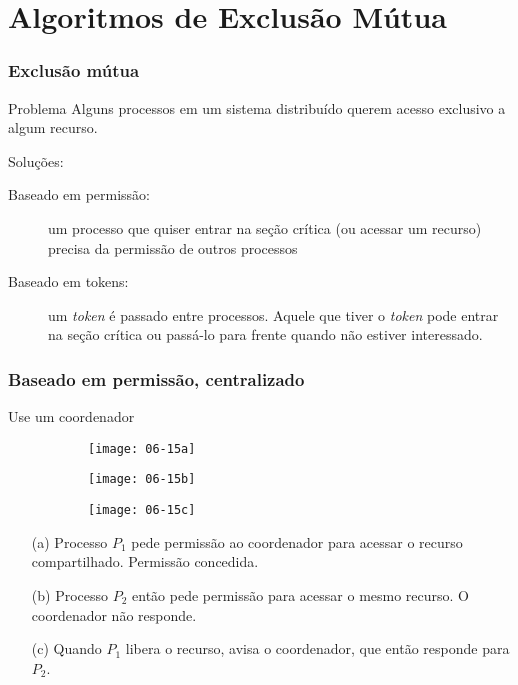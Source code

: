 \documentclass[Ligatures=TeX,table,brazil,svgnames,usetotalslideindicator,compress,10pt]{beamer}
\begin{document}
\section{Algoritmos de Exclusão Mútua}

\begin{frame}
  \frametitle{Exclusão mútua}
  \begin{alertblock}{Problema}
    Alguns processos em um sistema distribuído querem acesso exclusivo a algum recurso.
  \end{alertblock}

  \begin{block}{Soluções:}
    \begin{description}
    \item[Baseado em permissão:] um processo que quiser entrar na seção crítica (ou acessar um recurso) precisa da permissão de outros processos
    \item[Baseado em tokens:] um \textit{token} é passado entre processos. Aquele que tiver o \textit{token} pode entrar na seção crítica ou passá-lo para frente quando não estiver interessado.
    \end{description}

    \end{block}

\end{frame}

\begin{frame}
  \frametitle{Baseado em permissão, centralizado}
  \begin{block}{Use um coordenador}
    \begin{figure}
      \centering
      \begin{subfigure}{.3\linewidth}
        \texttt{[image: 06-15a]}
        \caption{}
      \end{subfigure}
      \quad
      \begin{subfigure}{.3\linewidth}
        \texttt{[image: 06-15b]}
        \caption{}
    \end{subfigure}
    \quad
      \begin{subfigure}{.3\linewidth}
        \texttt{[image: 06-15c]}
        \caption{}
      \end{subfigure}
    \end{figure}

    \begin{itemize}
    \item[(a)] Processo $P_1$ pede permissão ao coordenador para acessar o recurso compartilhado. Permissão concedida.
    \item[(b)] Processo $P_2$ então pede permissão para acessar o mesmo recurso. O coordenador não responde.
    \item[(c)] Quando $P_1$ libera o recurso, avisa o coordenador, que então responde para $P_2$.
    \end{itemize}
  \end{block}


\end{frame}
\end{document}
